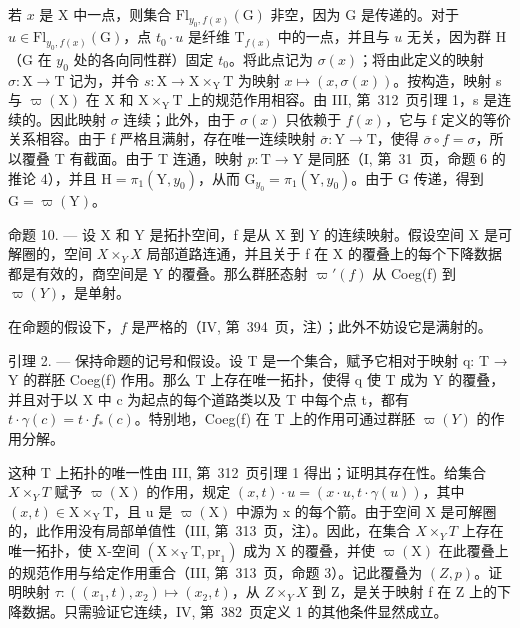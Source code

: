 若 \(x\) 是 X 中一点，则集合 \(\mathrm{Fl}_{y_0,f(x)}(\mathrm{G})\) 非空，因为 G 是传递的。对于 \(u\in \mathrm{Fl}_{y_0,f(x)}(\mathrm{G})\)，点 \(t_0\cdot u\) 是纤维 \(\mathrm{T}_{f(x)}\) 中的一点，并且与 \(u\) 无关，因为群 H（G 在 \(y_0\) 处的各向同性群）固定 \(t_0\)。将此点记为 \(\sigma (x)\)；将由此定义的映射 \(\sigma \colon \mathrm{X}\to \mathrm{T}\) 记为，并令 \(s\colon \mathrm{X}\to \mathrm{X}\times_{\mathrm{Y}}\mathrm{T}\) 为映射 \(x\mapsto (x,\sigma (x))\)。按构造，映射 s 与 \(\varpi (\mathrm{X})\) 在 X 和 \(\mathrm{X}\times_{\mathrm{Y}}\mathrm{T}\) 上的规范作用相容。由 III, 第~312~页引理 1，s 是连续的。因此映射 \(\sigma\) 连续；此外，由于 \(\sigma (x)\) 只依赖于 \(f(x)\)，它与 f 定义的等价关系相容。由于 f 严格且满射，存在唯一连续映射 \(\overline{\sigma}\colon \mathrm{Y}\to \mathrm{T}\)，使得 \(\overline{\sigma}\circ f = \sigma\)，所以覆叠 T 有截面。由于 T 连通，映射 \(p\colon \mathrm{T}\to \mathrm{Y}\) 是同胚（I, 第~31~页，命题 6 的推论 4），并且 \(\mathrm{H} = \pi_1(\mathrm{Y},y_0)\)，从而 \(\mathrm{G}_{y_0} = \pi_1(\mathrm{Y},y_0)\)。由于 G 传递，得到 \(\mathrm{G} = \varpi (\mathrm{Y})\)。

命题 10. --- 设 X 和 Y 是拓扑空间，f 是从 X 到 Y 的连续映射。假设空间 X 是可解圈的，空间 \(X\times_{Y}X\) 局部道路连通，并且关于 f 在 X 的覆叠上的每个下降数据都是有效的，商空间是 Y 的覆叠。那么群胚态射 \(\varpi'(f)\) 从 Coeg(f) 到 \(\varpi(Y)\)，是单射。

在命题的假设下，\(f\) 是严格的（IV, 第~394~页，注）；此外不妨设它是满射的。

引理 2. --- 保持命题的记号和假设。设 T 是一个集合，赋予它相对于映射 q: T → Y 的群胚 Coeg(f) 作用。那么 T 上存在唯一拓扑，使得 q 使 T 成为 Y 的覆叠，并且对于以 X 中 c 为起点的每个道路类以及 T 中每个点 t，都有 \(t \cdot \gamma(c) = t \cdot f_{*}(c)\)。特别地，Coeg(f) 在 T 上的作用可通过群胚 \(\varpi(Y)\) 的作用分解。

这种 T 上拓扑的唯一性由 III, 第~312~页引理 1 得出；证明其存在性。给集合 \(X\times_{Y}T\) 赋予 \(\varpi(\mathrm{X})\) 的作用，规定 \((x,t)\cdot u=(x\cdot u,t\cdot\gamma(u))\)，其中 \((x,t)\in\mathrm{X}\times_{\mathrm{Y}}\mathrm{T}\)，且 u 是 \(\varpi(\mathrm{X})\) 中源为 x 的每个箭。由于空间 X 是可解圈的，此作用没有局部单值性（III, 第~313~页，注）。因此，在集合 \(X\times_{Y}T\) 上存在唯一拓扑，使 X-空间 \((\mathrm{X}\times_{\mathrm{Y}}\mathrm{T},\mathrm{pr}_{1})\) 成为 X 的覆叠，并使 \(\varpi(\mathrm{X})\) 在此覆叠上的规范作用与给定作用重合（III, 第~313~页，命题 3）。记此覆叠为 \((Z,p)\)。证明映射 \(\tau: ((x_{1},t),x_{2})\mapsto(x_{2},t)\)，从 \(Z\times_{Y}X\) 到 Z，是关于映射 f 在 Z 上的下降数据。只需验证它连续，IV, 第~382~页定义 1 的其他条件显然成立。

